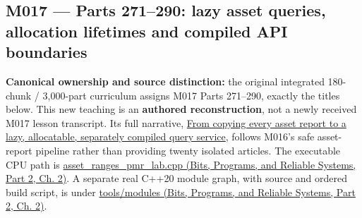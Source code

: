 \subsection{M017 --- Parts 271--290: lazy asset queries, allocation lifetimes and compiled API boundaries}\label{appendix-fd090d982a15-m017-parts-271290-lazy-asset-queries-allocation-lifetimes-and-compiled-api-boundaries}

\hypertarget{appendix-fd090d982a15-m017-parts-271290-lazy-asset-queries-allocation-lifetimes-and-compiled-api-boundaries}{}

\textbf{Canonical ownership and source distinction:} the original integrated 180-chunk / 3,000-part curriculum assigns M017 Parts 271--290, exactly the titles below. This new teaching is an \textbf{authored reconstruction}, not a newly received M017 lesson transcript. Its full narrative, \hyperref[01-foundations-i-ch006-from-copying-every-asset-report-to-a-lazy-allocatable-separately-compiled-query-service]{From copying every asset report to a lazy, allocatable, separately compiled query service}, follows M016's safe asset-report pipeline rather than providing twenty isolated articles. The executable CPU path is \href{../01-Bits-Programs-and-Reliable-Systems-P02/main.pdf\#nameddest=source-file-a1c76c44bc377537c732f5c4}{asset\_ranges\_pmr\_lab.cpp (Bits, Programs, and Reliable Systems, Part 2, Ch. 2)}. A separate real C++20 module graph, with source and ordered build script, is under \href{../01-Bits-Programs-and-Reliable-Systems-P02/main.pdf\#nameddest=source-file-e1b7c3e4f52da0e7c9c36a41}{tools/modules (Bits, Programs, and Reliable Systems, Part 2, Ch. 2)}.

